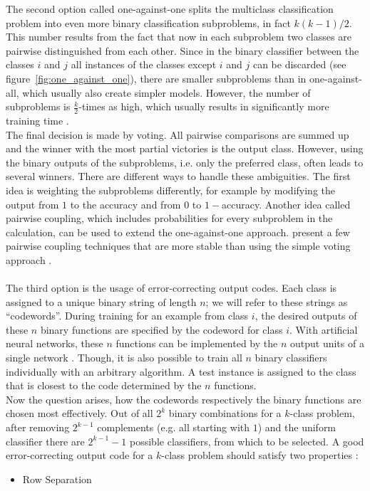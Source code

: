\documentclass[article,type=msc,colorback,accentcolor=tud7b]{tudthesis}
\begin{document}
\begin{itemize}
        The second option called one-against-one splits the multiclass classification problem into even more binary classification subproblems, in fact $k(k-1)/2$. This number results from the fact that now in each subproblem two classes are pairwise distinguished from each other. Since in the binary classifier between the classes $i$ and $j$ all instances of the classes except $i$ and $j$ can be discarded (see figure~\ref{fig:one_against_one}), there are smaller subproblems than in one-against-all, which usually also create simpler models. However, the number of subproblems is $\frac{k}{2}$-times as high, which usually results in significantly more training time \autocite[section~7.1.3]{Bishop2006}. \\
        The final decision is made by voting. All pairwise comparisons are summed up and the winner with the most partial victories is the output class. However, using the binary outputs of the subproblems, i.e. only the preferred class, often leads to several winners. There are different ways to handle these ambiguities. The first idea is weighting the subproblems differently, for example by modifying the output from $1$ to the accuracy and from $0$ to $1-$accuracy. Another idea called pairwise coupling, which includes probabilities for every subproblem in the calculation, can be used to extend the one-against-one approach. \citeauthor{Wu2004} present a few pairwise coupling techniques that are more stable than using the simple voting approach \autocite{Wu2004}. \\\\

        The third option is the usage of error-correcting output codes. Each class is assigned to a unique binary string of length $n$; we will refer to these strings as “codewords”. During training for an example from class $i$, the desired outputs of these $n$ binary functions are specified by the codeword for class $i$. With artificial neural networks, these $n$ functions can be implemented by the $n$ output units of a single network \autocite[chapter~1]{Dietterich1994}. Though, it is also possible to train all $n$ binary classifiers individually with an arbitrary algorithm. A test instance is assigned to the class that is closest to the code determined by the $n$ functions. \\
        Now the question arises, how the codewords respectively the binary functions are chosen most effectively. Out of all $2^{k}$ binary combinations for a $k$-class problem, after removing $2^{k-1}$ complements (e.g. all starting with $1$) and the uniform classifier there are $2^{k-1}-1$ possible classifiers, from which to be selected. A good error-correcting output code for a $k$-class problem should satisfy two properties \autocite[section~2.3]{Dietterich1994}:
        \begin{itemize}
          \item Row Separation


\end{itemize}
\end{itemize}
\end{document}
